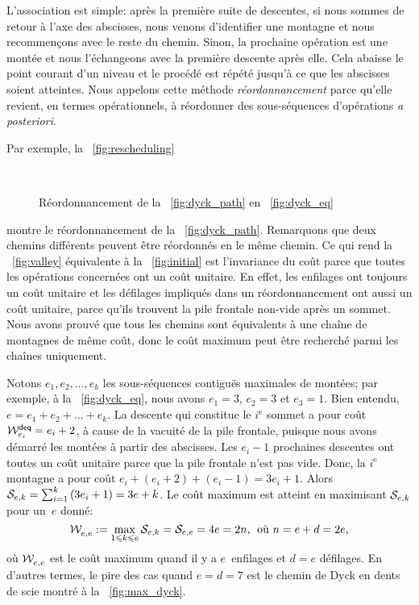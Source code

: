 L'association est simple: après la première suite de descentes, si
nous sommes de retour à l'axe des abscisses, nous venons d'identifier
une montagne et nous recommençons avec le reste du chemin. Sinon, la
prochaine opération est une montée et nous l'échangeons avec la
première descente après elle. Cela abaisse le point courant d'un
niveau et le procédé est répété jusqu'à ce que les abscisses soient
atteintes. Nous appelons cette méthode
\emph{réordonnancement} parce
qu'elle revient, en termes opérationnels, à réordonner des
sous-séquences d'opérations \emph{a posteriori}.

Par exemple, la \fig~\vref{fig:rescheduling}
\begin{figure}
\centering
{}
\qquad
{}\\
\qquad
{}
\caption{Réordonnancement de la \fig~\ref{fig:dyck_path} en  \fig~\ref{fig:dyck_eq}}
\label{fig:rescheduling}
\end{figure}
montre le réordonnancement de la \fig~\vref{fig:dyck_path}. Remarquons
que deux chemins différents peuvent être réordonnés en le même
chemin. Ce qui rend la \fig~\ref{fig:valley} équivalente à la
\fig~\ref{fig:initial} est l'invariance du coût parce que toutes les
opérations concernées ont un coût unitaire. En effet, les enfilages
ont toujours un coût unitaire et les défilages impliqués dans un
réordonnancement ont aussi un coût unitaire, parce qu'ils trouvent la
pile frontale non-vide après un sommet. Nous avons prouvé que tous les
chemins sont équivalents à une chaîne de montagnes de même coût, donc
le coût maximum peut être recherché parmi les chaînes uniquement.

Notons \(e_1, e_2, \dots, e_k\) les sous-séquences contiguës maximales
de montées; par exemple, à la \fig~\ref{fig:dyck_eq}, nous avons
\(e_1=3\), \(e_2 = 3\) et \(e_3 = 1\). Bien entendu, \(e = e_1 + e_2 +
\dots + e_k\). La descente qui constitue le \(i^\text{e}\) sommet a
pour coût  \(\W{\fun{deq}}{e_i} = e_i +
2\), à cause de la vacuité de la pile frontale, puisque nous avons
démarré les montées à partir des abscisses. Les \(e_i-1\) prochaines
descentes ont toutes un coût unitaire parce que la pile frontale n'est
pas vide. Donc, la \(i^\text{e}\) montagne a pour coût
\(e_i+(e_i+2)+(e_i-1) = 3e_i+1\). Alors \(\A{e,k} =
\sum_{i=1}^{k}{(3e_i+1)} = 3e + k\). Le coût maximum est atteint en
maximisant \(\A{e,k}\) pour un~\(e\) donné:
\begin{equation*}
\W{}{e,e} := \max_{1 \leqslant k \leqslant e}{\A{e,k}} = \A{e,e} = 4e
= 2n,\,\; \text{où \(n=e+d=2e\)},
\end{equation*}
où \(\W{}{e,e}\) est le coût maximum quand il y a \(e\)~enfilages et
\({d=e}\) défilages. En d'autres termes, le pire des cas quand
\(e=d=7\) est le chemin de Dyck en dents de scie montré à la
\fig~\vref{fig:max_dyck}.

